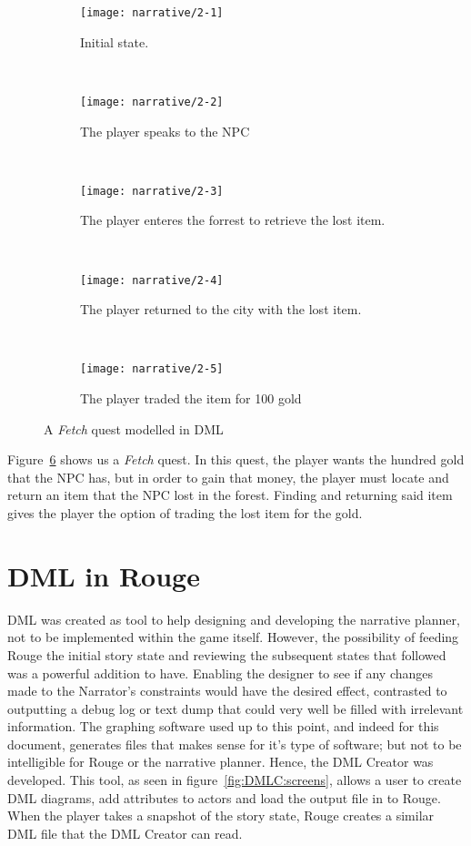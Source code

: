 \begin{figure}[p]
	\centering
	\begin{subfigure}[b]{0.4\textwidth}
		\texttt{[image: narrative/2-1]}
		\caption{Initial state.}\label{fig:narrative2:1}
	\end{subfigure}
		~
	\begin{subfigure}[b]{0.4\textwidth}
		\texttt{[image: narrative/2-2]}
		\caption{The player speaks to the NPC}\label{fig:narrative2:2}
	\end{subfigure}
		~
	\begin{subfigure}[b]{0.4\textwidth}
		\texttt{[image: narrative/2-3]}
		\caption{The player enteres the forrest to retrieve the lost item.}\label{fig:narrative:2:3}
	\end{subfigure}
		~
	\begin{subfigure}[b]{0.4\textwidth}
		\texttt{[image: narrative/2-4]}
		\caption{The player returned to the city with the lost item.}\label{fig:narrative2:4}
	\end{subfigure}
		~
	\begin{subfigure}[b]{0.4\textwidth}
		\texttt{[image: narrative/2-5]}
		\caption{The player traded the item for 100 gold}\label{fig:narrative2:5}
	\end{subfigure}
	\caption{A \textit{Fetch} quest modelled in DML}\label{fig:narrative2}
\end{figure}

Figure~\ref{fig:narrative2} shows us a \textit{Fetch} quest. 
In this quest, the player wants the hundred gold that the NPC has, but in order to gain that money, the player must locate and return an item that the NPC lost in the forest.
Finding and returning said item gives the player the option of trading the lost item for the gold. 

\section{DML in Rouge}
DML was created as tool to help designing and developing the narrative planner, not to be implemented within the game itself. 
However, the possibility of feeding Rouge the initial story state and reviewing the subsequent states that followed was a powerful addition to have.
Enabling the designer to see if any changes made to the Narrator's constraints would have the desired effect, contrasted to outputting a debug log or text dump that could very well be filled with irrelevant information.
The graphing software used up to this point, and indeed for this document, generates files that makes sense for it's type of software; but not to be intelligible for Rouge or the narrative planner.
Hence, the DML Creator was developed.
This tool, as seen in figure~\ref{fig:DMLC:screens}, allows a user to create DML diagrams, add attributes to actors and load the output file in to Rouge.
When the player takes a snapshot of the story state, Rouge creates a similar DML file that the DML Creator can read. 

